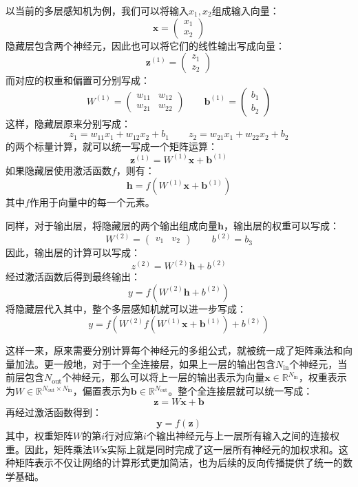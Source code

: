 以当前的多层感知机为例，我们可以将输入$x_1,x_2$组成输入向量：
$$
\boldsymbol{x}=\begin{pmatrix}
x_1\\
x_2
\end{pmatrix}
$$
隐藏层包含两个神经元，因此也可以将它们的线性输出写成向量：
$$
\boldsymbol{z}^{(1)}=\begin{pmatrix}
z_1\\
z_2
\end{pmatrix}
$$
而对应的权重和偏置可分别写成：
$$
W^{(1)}=\begin{pmatrix}
w_{11}&w_{12}\\
w_{21}&w_{22}
\end{pmatrix} \qquad
\boldsymbol{b}^{(1)}=\begin{pmatrix}
b_1\\
b_2
\end{pmatrix}
$$
这样，隐藏层原来分别写成：
$$
z_1=w_{11}x_1+w_{12}x_2+b_1 \qquad z_2=w_{21}x_1+w_{22}x_2+b_2
$$
的两个标量计算，就可以统一写成一个矩阵运算：
$$
\boldsymbol{z}^{(1)}=W^{(1)}\boldsymbol{x}+\boldsymbol{b}^{(1)}
$$
如果隐藏层使用激活函数$f$，则有：
$$
\boldsymbol{h}=f\left(W^{(1)}\boldsymbol{x}+\boldsymbol{b}^{(1)}\right)
$$
其中$f$作用于向量中的每一个元素。

同样，对于输出层，将隐藏层的两个输出组成向量$\boldsymbol{h}$，输出层的权重可以写成：
$$
W^{(2)}=\begin{pmatrix}
v_1&v_2
\end{pmatrix} \qquad b^{(2)}=b_3
$$
因此，输出层的计算可以写成：
$$
z^{(2)}=W^{(2)}\boldsymbol{h}+b^{(2)}
$$
经过激活函数后得到最终输出：
$$
y=f\left(W^{(2)}\boldsymbol{h}+b^{(2)}\right)
$$
将隐藏层代入其中，整个多层感知机就可以进一步写成：
$$
y=f\left(W^{(2)}f\left(W^{(1)}\boldsymbol{x}+\boldsymbol{b}^{(1)}\right)+b^{(2)}\right)
$$

这样一来，原来需要分别计算每个神经元的多组公式，就被统一成了矩阵乘法和向量加法。更一般地，对于一个全连接层，如果上一层的输出包含$N_{\mathrm{in}}$个神经元，当前层包含$N_{\mathrm{out}}$个神经元，那么可以将上一层的输出表示为向量$\boldsymbol{x}\in\mathbb{R}^{N_{\mathrm{in}}}$，权重表示为$W\in\mathbb{R}^{N_{\mathrm{out}}\times N_{\mathrm{in}}}$，偏置表示为$\boldsymbol{b}\in\mathbb{R}^{N_{\mathrm{out}}}$。整个全连接层就可以统一写成：
$$
\boldsymbol{z}=W\boldsymbol{x}+\boldsymbol{b}
$$
再经过激活函数得到：
$$
\boldsymbol{y}=f(\boldsymbol{z})
$$
其中，权重矩阵$W$的第$i$行对应第$i$个输出神经元与上一层所有输入之间的连接权重。因此，矩阵乘法$W\boldsymbol{x}$实际上就是同时完成了这一层所有神经元的加权求和。这种矩阵表示不仅让网络的计算形式更加简洁，也为后续的反向传播提供了统一的数学基础。

